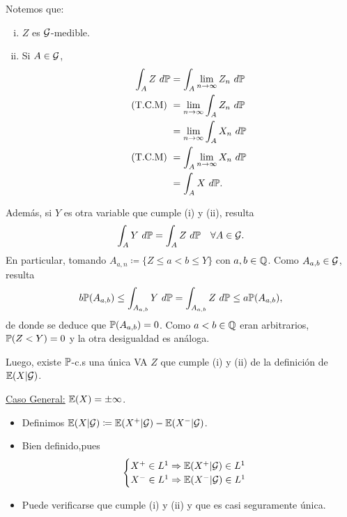 Notemos que:
\begin{enumerate}[i)]
	\item $Z$ es $\mathcal{G}$-medible.
 
	\item Si $A \in \mathcal{G}$,
	\begin{align*}
		\int_{A} Z \ d\mbb{P} &= \int_{A} \lim_{n \to \infty} Z_{n} \ d\mbb{P} \\
		\text{(T.C.M) } &= \lim_{n \to \infty} \int_{A} Z_{n} \ d\mbb{P} \\
		&= \lim_{n \to \infty} \int_{A} X_{n} \ d\mbb{P} \\
		\text{(T.C.M) } &= \int_{A} \lim_{n \to \infty} X_{n} \ d\mbb{P} \\
		&= \int_{A} X \ d\mbb{P}
	.\end{align*}
\end{enumerate}
Además, si $Y$ es otra variable que cumple (i) y (ii), resulta
\[ \int_{A} Y \ d\mathbb{P} = \int_{A} Z \ d\mathbb{P} \quad \forall A \in \mathcal{G}. \]
En particular, tomando $A_{a,n} \coloneq \{ Z \leq a < b \leq Y \}$ con $a,b \in \mathbb{Q}$. Como $A_{a,b} \in \mathcal{G}$, resulta
\[ b \mbb{P}(A_{a,b}) \leq \int_{A_{a,b}} Y \ d\mbb{P} = \int_{A_{a,b}} Z \ d\mbb{P} \leq a \mbb{P}(A_{a,b}), \]
de donde se deduce que $\mathbb{P}(A_{a,b}) = 0$. Como $a < b \in \mathbb{Q}$ eran arbitrarios, $\mathbb{P}(Z < Y) = 0$ y la otra desigualdad es análoga. \par
Luego, existe $\mathbb{P}$-c.s una única VA $Z$ que cumple (i) y (ii) de la definición de $\mathbb{E}(X | \mathcal{G})$.
\par \medskip
\noindent \underline{Caso General:} $\mathbb{E}(X) = \pm \infty$.
\begin{itemize}
	\item Definimos $\mathbb{E}(X | \mathcal{G}) \coloneq \mathbb{E}(X^{+} | \mathcal{G}) - \mathbb{E}(X^{-} | \mathcal{G})$.

	\item Bien definido,pues
	\[ \begin{cases}
		X^{+} \in L^{1} \Rightarrow \mathbb{E}(X^{+} | \mathcal{G}) \in L^{1} \\
		X^{-} \in L^{1} \Rightarrow \mathbb{E}(X^{-} | \mathcal{G}) \in L^{1}
	\end{cases} \]

	\item Puede verificarse que cumple (i) y (ii) y que es casi seguramente única.
\end{itemize}

